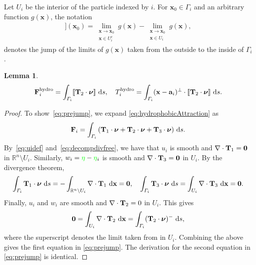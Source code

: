 \documentclass[lineno]{jfm}
\newtheorem{lemma}{Lemma}
\renewcommand{\aa}{\mathbf{a}}
\newcommand{\FF}{\mathbf{F}}
\newcommand{\nnu}{\boldsymbol{\nu}}
\newcommand{\xx}{\mathbf{x}}
\newcommand{\jump}[1]{[\![ #1 ]\!]}
\newcommand{\ReviewerTwo}[1]{\textcolor{green}{#1}}
\begin{document}
Let $U_i$ be the interior of the particle indexed by $i$. For $\xx_0
\in \Gamma_i$ and an arbitrary function $g(\xx)$, the notation
\begin{align}
  \jump{g}(\xx_0) = \lim_{\substack{\xx \to \xx_0 \\ \xx \in U_i^c}}g(\xx)  - 
                    \lim_{\substack{\xx \to \xx_0 \\ \xx \in U_i}}g(\xx),
\end{align}
denotes the jump of the limits of $g(\xx)$ taken from the outside to
the inside of $\Gamma_i$.
\begin{lemma}
\begin{align}
  \label{eq:prejump}
  \FF_i^{\mathrm{hydro}} = \int_{\Gamma_i} \jump{{\bf T}_2 \cdot \nnu}  \, \dif s,\quad
  T_i^{\mathrm{hydro}} = \int_{\Gamma_i} (\xx - \aa_i)^{\perp} \cdot
  \jump{{\bf T}_2 \cdot \nnu} \, \dif s.
\end{align}
\end{lemma}
\begin{proof}
To show~\eqref{eq:prejump}, we expand \eqref{eq:hydrophobicAttraction} as
\begin{align}
  \FF_i = \int_{\Gamma_i} \left({\bf T}_1 \cdot \nnu + 
    {\bf T}_2 \cdot \nnu + {\bf T}_3 \cdot \nnu \right) \,\dif s.
\end{align}
By~\eqref{eq:uidef} and~\eqref{eq:decompdivfree}, we have that $u_i$ is
smooth and $\nabla \cdot {\bf T}_1 = \mathbf{0}$ in $\mathbb{R}^n
\setminus U_i$. Similarly, $w_i = \ReviewerTwo{\eta} - \ReviewerTwo{\eta}_i$ is smooth and $\nabla \cdot
{\bf T}_3 = \mathbf{0}$ in $U_i$. By the divergence theorem,  
\begin{align}
  \int_{\Gamma_i}  {\bf T}_1 \cdot \nnu \,\dif s
  = -\int_{\mathbb{R}^n \setminus U_i} \nabla \cdot {\bf T}_1 \,\dif \xx = \mathbf{0},\quad
    \int_{\Gamma_i}  {\bf T}_3 \cdot \nnu\,\dif s
  = \int_{U_i} \nabla \cdot {\bf T}_3 \,\dif \xx = \mathbf{0}.
\end{align}
Finally, $u_i$ and $w_i$ are smooth and $\nabla \cdot {\bf T}_2= 0$ in $U_i$. This gives
\begin{align}
  \mathbf{0} = \int_{U_i} \nabla \cdot {\bf T}_2 \, \dif \xx = \int_{\Gamma_i}  
    ({\bf T}_2 \cdot \nnu)^-\,\dif s,
\end{align}
where the superscript denotes the limit taken from in $U_i$.  
Combining the above gives the first equation in \eqref{eq:prejump}.
The derivation for the second equation in \eqref{eq:prejump} is identical. 
\end{proof}
\end{document}
